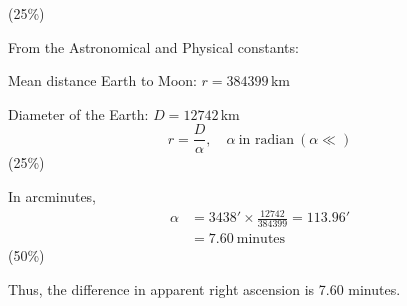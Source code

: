 \hfill(25\%)

From the Astronomical and Physical constants:

Mean distance Earth to Moon: $r = 384399$\,km

Diameter of the Earth: $D = 12742$\,km
\[
  r = \frac{D}{\alpha}, \quad \alpha\ \text{in radian}\ (\alpha \ll)
\]
\hfill(25\%)

In arcminutes,
\begin{align*}
  \alpha &= 3438' \times \frac{12742}{384399} = 113.96' \\
  &= 7.60\ \text{minutes}
\end{align*}
\hfill(50\%)

Thus, the difference in apparent right ascension is 7.60 minutes.
